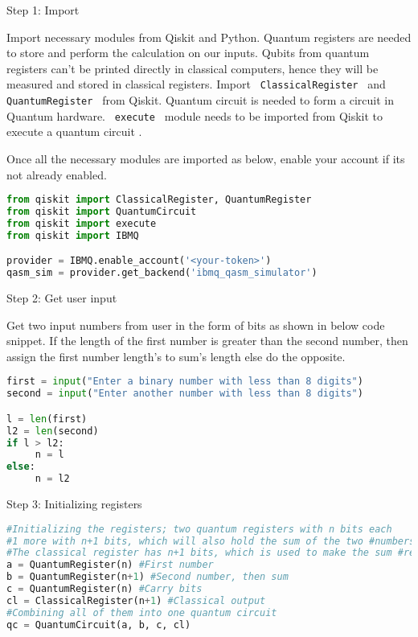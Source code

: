 \documentclass{cpp}
\begin{document}
Step 1: Import

Import necessary modules from Qiskit and Python. Quantum registers are needed to store and perform the calculation on our inputs. Qubits from quantum registers can't be printed directly in classical computers, hence they will be measured and stored in classical registers. Import \texttt{ ClassicalRegister } and \texttt{ QuantumRegister } from Qiskit. Quantum circuit is needed to form a circuit in Quantum hardware. \texttt{ execute } module needs to be imported from Qiskit to execute a quantum circuit \cite{sashwat_simple_adder}. 

Once all the necessary modules are imported as below, enable your account if its not already enabled. 

\begin{lstlisting}[language=Python]
from qiskit import ClassicalRegister, QuantumRegister
from qiskit import QuantumCircuit
from qiskit import execute
from qiskit import IBMQ

provider = IBMQ.enable_account('<your-token>')
qasm_sim = provider.get_backend('ibmq_qasm_simulator')
\end{lstlisting}

\newpage
Step 2: Get user input

Get two input numbers from user in the form of bits as shown in below code snippet. If the length of the first number is greater than the second number, then assign the first number length’s to sum’s length else do the opposite. 

\begin{lstlisting}[language=Python]
first = input("Enter a binary number with less than 8 digits")
second = input("Enter another number with less than 8 digits")

l = len(first)
l2 = len(second)
if l > l2:
     n = l
else:
     n = l2
\end{lstlisting}

Step 3: Initializing registers

\begin{lstlisting}[language=Python]
#Initializing the registers; two quantum registers with n bits each
#1 more with n+1 bits, which will also hold the sum of the two #numbers
#The classical register has n+1 bits, which is used to make the sum #readable
a = QuantumRegister(n) #First number
b = QuantumRegister(n+1) #Second number, then sum
c = QuantumRegister(n) #Carry bits
cl = ClassicalRegister(n+1) #Classical output
#Combining all of them into one quantum circuit
qc = QuantumCircuit(a, b, c, cl)
\end{lstlisting}
\end{document}
